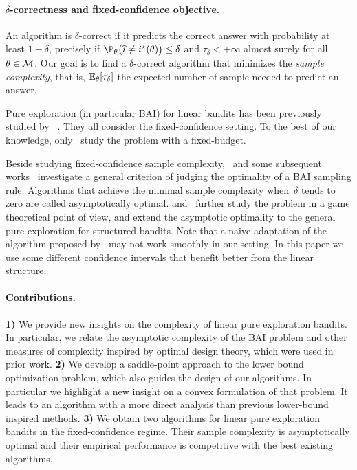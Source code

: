 \paragraph{$\delta$-correctness and fixed-confidence objective.}
An algorithm is $\delta$-correct if it predicts the correct answer with probability at least $1-\delta$, precisely if $\P_\theta \big(\hi \neq \istar(\theta)\big) \leq \delta$ and $\tau_\delta < +\infty$ almost surely for all $\theta \in\mathcal{M}$. Our goal is to find a $\delta$-correct algorithm that minimizes the \emph{sample complexity}, that is,  $\mathbb{E}_\theta[\tau_\delta]$ the expected number of sample needed to predict an answer.

Pure exploration (in particular BAI) for linear bandits has been previously studied by
~\citet{soare2014linear,tao2018alba,xu2018linear,zaki2019maxoverlap,fiez2019transductive,kazerouni2019glb}. They all consider the fixed-confidence setting. To the best of our knowledge, only~\citet{hoffman2014bayesgap} study the problem with a fixed-budget.

Beside studying fixed-confidence sample complexity,~\citet{garivier2016tracknstop} and some subsequent works~\citep{qin2017ttei,shang2020t3c} investigate a general criterion of judging the optimality of a BAI sampling rule: Algorithms that achieve the minimal sample complexity when~$\delta$ tends to zero are called asymptotically optimal. \citet{menard2019lma} and~\citet{degenne2019game} further study the problem in a game theoretical point of view, and extend the asymptotic optimality to the general pure exploration for structured bandits. Note that a naive adaptation of the algorithm proposed by~\citet{degenne2019game} may not work smoothly in our setting. In this paper we use some different confidence intervals that benefit better from the linear structure.

\paragraph{Contributions.}
\textbf{1)}
We provide new insights on the complexity of linear pure exploration bandits. In particular, we relate the asymptotic complexity of the BAI problem and other measures of complexity inspired by optimal design theory, which were used in prior work.
\textbf{2)}
We develop a saddle-point approach to the lower bound optimization problem, which also guides the design of our algorithms. In particular we highlight a new insight on a convex formulation of that problem. It leads to an algorithm with a more direct analysis than previous lower-bound inspired methods.
\textbf{3)}
We obtain two algorithms for linear pure exploration bandits in the fixed-confidence regime. Their sample complexity is asymptotically optimal and their empirical performance is competitive with the best existing algorithms.

%
%
%
